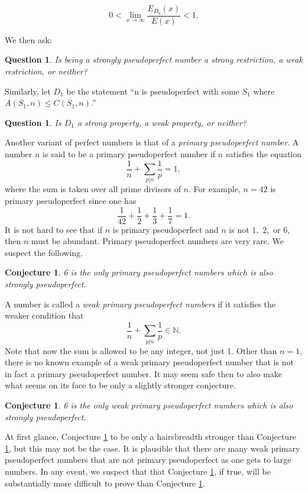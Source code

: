 \documentclass{article}
\newtheorem{conjecture}[theorem]{Conjecture}
\newtheorem{question}[theorem]{Question}
\begin{document}
$$0< \lim_{x \rightarrow \infty} \frac{E_{D_0}(x)}{E(x)} < 1.$$

We then ask:

\begin{question} Is being a strongly pseudoperfect number a strong restriction, a weak restriction, or neither?
\end{question}

Similarly, let $D_1$ be the statement ``n is pseudoperfect with some $S_1$ where $A(S_1,n) \leq C(S_1,n)$.''

\begin{question} Is $D_1$ a strong property, a weak property, or neither?
\end{question}

Another variant of perfect numbers is that of a \emph{primary pseudoperfect number}.\cite{Sondow and MacMillan}  A number $n$ is said to be a primary pseudoperfect number if $n$ satisfies the equation
$$\frac{1}{n}+\sum_{p|n} \frac{1}{p} =1,$$ where the sum is taken over all prime divisors of $n$. For example, $n=42$ is primary pseudoperfect since one has $$\frac{1}{42} + \frac{1}{2} + \frac{1}{3} + \frac{1}{7} =1. $$ It is not hard to see that if $n$ is primary pseudoperfect and $n$ is not $1,$ $2,$ or $6$, then $n$ must be abundant. Primary pseudoperfect numbers are very rare. We suspect the following.

\begin{conjecture} \label{no primary pseud is strongly pseud}
6 is the only primary pseudoperfect numbers which is also strongly pseudoperfect. \end{conjecture}

A number is called a \emph{weak primary pseudoperfect numbers} if it satisfies the weaker condition that $$\frac{1}{n}+\sum_{p|n} \frac{1}{p} \in \mathbb{N}.$$ Note that now the sum is allowed to be any integer, not just 1. Other than $n=1$, there is no known example of a weak primary pseudoperfect number that is not in fact a primary pseudoperfect number. It may seem safe then to also make what seems on its face to be only a slightly stronger conjecture.

\begin{conjecture} \label{no weak primary pseud is strongly pseud}
6 is the only weak primary pseudoperfect numbers which is also strongly pseudoperfect. \end{conjecture}

At first glance, Conjecture  \ref{no weak primary pseud is strongly pseud} to be only a hairsbreadth stronger than Conjecture \ref{no primary pseud is strongly pseud}, but this may not be the case. It is plausible that there are many weak primary pseudoperfect numbers that are not primary pseudoperfect as one gets to large numbers. In any event, we suspect that that Conjecture \ref{no weak primary pseud is strongly pseud}, if true, will be substantially more difficult to prove than Conjecture  \ref{no primary pseud is strongly pseud}.
\end{document}
